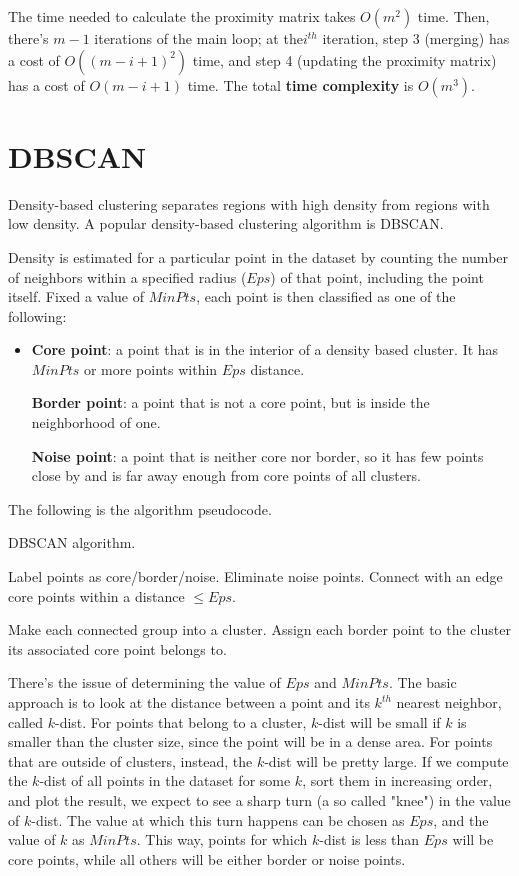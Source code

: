 The time needed to calculate the proximity matrix takes $O(m^2)$ time. Then, there's $m-1$ iterations of the main loop; at the$i^{th}$ iteration, step 3 (merging) has a cost of $O((m-i+1)^2)$ time, and step 4 (updating the proximity matrix) has a cost of $O(m-i+1)$ time. The total \textbf{time complexity} is $O(m^3)$.

\section{DBSCAN}

Density-based clustering separates regions with high density from regions with low density. A popular density-based clustering algorithm is DBSCAN.

Density is estimated for a particular point in the dataset by counting the number of neighbors within a specified radius ($Eps$) of that point, including the point itself. Fixed a value of $MinPts$, each point is then classified as one of the following:

\begin{itemize}
    \item \textbf{Core point}: a point that is in the interior of a density based cluster. It has $MinPts$ or more points within $Eps$ distance.

    \textbf{Border point}: a point that is not a core point, but is inside the neighborhood of one.

    \textbf{Noise point}: a point that is neither core nor border, so it has few points close by and is far away enough from core points of all clusters.
\end{itemize}

The following is the algorithm pseudocode.

\begin{algorithm}
\caption{DBSCAN algorithm.}
\begin{algorithmic}[1]
    \State Label points as core/border/noise.
    \State Eliminate noise points.
    \State Connect with an edge core points within a distance $\leq Eps$.

    \State Make each connected group into a cluster.
    \State Assign each border point to the cluster its associated core point belongs to.
\end{algorithmic}
\end{algorithm}

There's the issue of determining the value of $Eps$ and $MinPts$. The basic approach is to look at the distance between a point and its $k^{th}$ nearest neighbor, called $k$-dist. For points that belong to a cluster, $k$-dist will be small if $k$ is smaller than the cluster size, since the point will be in a dense area. For points that are outside of clusters, instead, the $k$-dist will be pretty large. If we compute the $k$-dist of all points in the dataset for some $k$, sort them in increasing order, and plot the result, we expect to see a sharp turn (a so called "knee") in the value of $k$-dist. The value at which this turn happens can be chosen as $Eps$, and the value of $k$ as $MinPts$. This way, points for which $k$-dist is less than $Eps$ will be core points, while all others will be either border or noise points.

